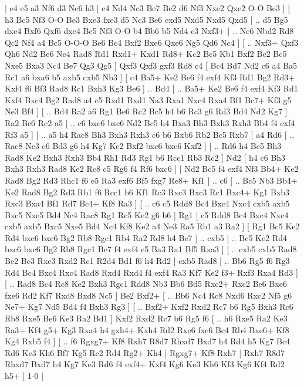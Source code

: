 \makegametitle 
|   e4   e5    a3   Nf6    d3   Nc6    h3 [  c4 Nd4  Nc3 Be7  Be2 d6  Nf3 Nxe2  Qxe2 O-O  Be3   ]  [  h3 Bc5  Nf3 O-O  Be3 Bxe3  fxe3 d5  Nc3 Be6  exd5 Nxd5  Nxd5 Qxd5   ] .. d5    Bg5   dxe4    Bxf6   Qxf6    dxe4   Bc5    Nf3   O-O    b4   Bb6    b5   Nd4    c3   Nxf3+ [ .. Ne6  Nbd2 Rd8  Qc2 Nf4  a4 Bc5  O-O-O Be6  Bc4 Bxf2  Bxe6 Qxe6  Ng5 Qd6  Nc4   ]  [ .. Nxf3+  Qxf3 Qh6  Nd2 Be6  Nc4 Rad8  Rd1 Rxd1+  Kxd1 Rd8+  Kc2 Bc5  Kb1 Bxf2  Be2 Bc5  Nxe5 Bxa3  Nc4 Be7  Qg3 Qg5   ]  Qxf3   Qxf3    gxf3   Rd8    c4 [  Bc4 Bd7  Nd2 c6  a4 Ba5  Rc1 a6  bxa6 b5  axb5 cxb5  Nb3   ]  [  c4 Ba5+  Ke2 Be6  f4 exf4  Kf3 Rd1  Bg2 Rd3+  Kxf4 f6  Bf3 Rad8  Rc1 Bxh3  Kg3 Be6   ] .. Bd4 [ .. Ba5+  Ke2 Be6  f4 exf4  Kf3 Rd1  Kxf4 Bxc4  Bg2 Rad8  a4 c5  Rxd1 Rxd1  Na3 Rxa1  Nxc4 Rxa4  Bf1 Bc7+  Kf3 g5  Ne3 Bf4   ]  [ .. Bd4  Ra2 a6  Rg1 Be6  Rc2 Bc5  h4 b6  Rc3 g6  Rd3 Bd4  Nd2 Kg7   ]  Ra2   Be6    Rc2   a5 [ .. c6  bxc6 bxc6  Nd2 Bc5  h4 Bxa3  Bh3 Bxh3  Rxh3 Bb4  f4 exf4  Rf3 a5   ]  [ .. a5  h4 Rac8  Bh3 Bxh3  Rxh3 c6  b6 Bxb6  Rb2 Bc5  Rxb7   ]  a4   Rd6 [ .. Rac8  Nc3 c6  Bd3 g6  h4 Kg7  Ke2 Bxf2  bxc6 bxc6  Kxf2   ]  [ .. Rd6  h4 Bc5  Bh3 Rad8  Ke2 Bxh3  Rxh3 Bb4  Rh1 Rd3  Rg1 b6  Rcc1 Rb3  Rc2   ]  Nd2 [  h4 c6  Bh3 Bxh3  Rxh3 Rad8  Ke2 Rc8  c5 Rg6  f4 Rf6  bxc6   ]  [  Nd2 Bc5  f4 exf4  Nf3 Bb4+  Ke2 Rad8  Bg2 Rd3  Rhc1 f6  e5 Ra3  exf6 Bf5  fxg7 Re8+  Kf1   ] .. c6 [ .. Bc5  Nb3 Bb4+  Ke2 Rad8  Bg2 Rd3  Rb1 f6  Rcc1 b6  Kf1 Rc3  Rxc3 Bxc3  Rc1 Bxc4+  Kg1 Bxb3  Rxc3 Bxa4  Bf1 Rd7  Bc4+ Kf8  Ra3   ]  [ .. c6  c5 Rdd8  Bc4 Bxc4  Nxc4 cxb5  axb5 Bxc5  Nxe5 Bd4  Nc4 Rac8  Rg1 Rc5  Ke2 g6  b6   ]  Rg1 [  c5 Rdd8  Bc4 Bxc4  Nxc4 cxb5  axb5 Bxc5  Nxe5 Bd4  Nc4 Kf8  Ke2 a4  Ne3 Ra5  Rb1 a3  Ra2   ]  [  Rg1 Bc5  Ke2 Rd4  bxc6 bxc6  Bg2 Rb8  Rgc1 Rb4  Ra2 Rd8  h4 Be7   ] .. cxb5 [ .. Bc5  Ke2 Rd4  bxc6 bxc6  Bg2 Rb8  Rgc1 Be7  f4 exf4  e5 Ba3  Ra1 Bf5  Rxa3   ]  [ .. cxb5  cxb5 Rad8  Be2 Bc3  Rxc3 Rxd2  Rc1 R2d4  Bd1 f6  h4 Rd2   ]  cxb5   Rad8 [ .. Bb6  Rg5 f6  Rg3 Rd4  Bc4 Bxc4  Rxc4 Rad8  Rxd4 Rxd4  f4 exf4  Ra3 Kf7  Ke2 f3+  Rxf3 Rxa4  Rd3   ]  [ .. Rad8  Bc4 Rc8  Ke2 Bxh3  Rgc1 Rdd8  Nb3 Bb6  Bd5 Rxc2+  Rxc2 Be6  Bxe6 fxe6  Rd2 Kf7  Rxd8 Bxd8  Nc5   ]  Be2   Bxf2+ [ .. Bb6  Nc4 Rc8  Nxd6 Rxc2  Nf5 g6  Ne7+ Kg7  Nd5 Bd4  f4 Bxh3  Rg3   ]  [ .. Bxf2+  Kxf2 Rxd2  Rc7 b6  Rg5 Bxh3  Rc6 Rb8  Rxe5 Be6  Ke3 Ra2  Bd1   ]  Kxf2   Rxd2    Rc7   b6    Rg5   f6 [ .. h6  Rxe5 Ra2  Ke3 Ra3+  Kf4 g5+  Kg3 Rxa4  h4 gxh4+  Kxh4 Rd2  Rxe6 fxe6  Bc4 Rb4  Bxe6+ Kf8  Kg4 Rxb5  f4   ]  [ .. f6  Rgxg7+ Kf8  Rxh7 R8d7  Rhxd7 Bxd7  h4 Rd4  h5 Kg7  Bc4 Rd6  Ke3 Kh6  Bf7 Kg5  Rc2 Rd4  Rg2+ Kh4   ]  Rgxg7+   Kf8    Rxh7    [  Rxh7 R8d7  Rhxd7 Bxd7  h4 Kg7  Ke3 Rd6  f4 exf4+  Kxf4 Kg6  Ke3 Kh6  Kf3 Kg6  Kf4 Rd2  h5+   ] 1-0  |
